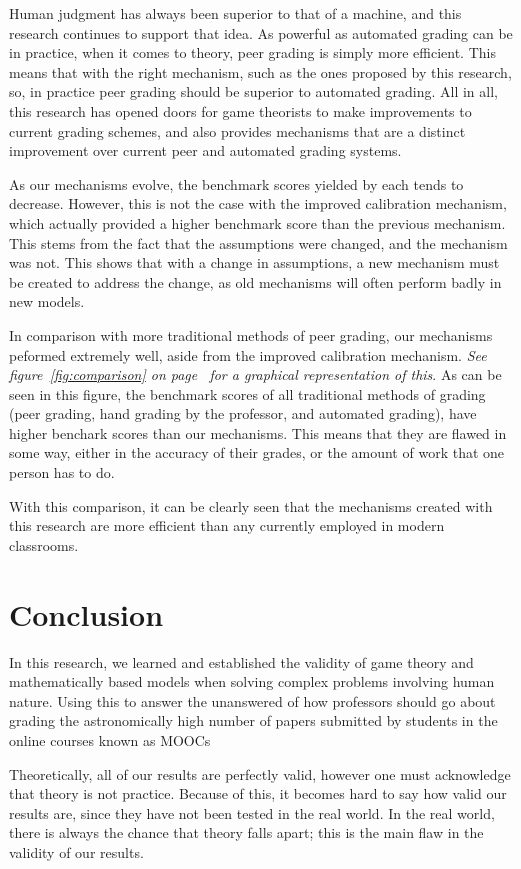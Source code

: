 \documentclass[12pt, Arial]{article}
\begin{document}
Human judgment has always been superior to that of a machine, and this research continues to support that idea. As powerful as automated grading can be in practice, when it comes to theory, peer grading is simply more efficient. This means that with the right mechanism, such as the ones proposed by this research, so, in practice peer grading should be superior to automated grading. All in all, this research has opened doors for game theorists to make improvements to current grading schemes, and also provides mechanisms that are a distinct improvement over current peer and automated grading systems.

As our mechanisms evolve, the benchmark scores yielded by each tends to decrease. However, this is not the case with the improved calibration mechanism, which actually provided a higher benchmark score than the previous mechanism. This stems from the fact that the assumptions were changed, and the mechanism was not. This shows that with a change in assumptions, a new mechanism must be created to address the change, as old mechanisms will often perform badly in new models.

In comparison with more traditional methods of peer grading, our mechanisms peformed extremely well, aside from the improved calibration mechanism. \emph{See figure~\ref{fig:comparison} on page~\pageref{fig:comparison} for a graphical representation of this}. As can be seen in this figure, the benchmark scores of all traditional methods of grading (peer grading, hand grading by the professor, and automated grading), have higher benchark scores than our mechanisms. This means that they are flawed in some way, either in the accuracy of their grades, or the amount of work that one person has to do.

With this comparison, it can be clearly seen that the mechanisms created with this research are more efficient than any currently employed in modern classrooms.

\section{Conclusion}
In this research, we learned and established the validity of game theory and mathematically based models when solving complex problems involving human nature. Using this to answer the unanswered of how professors should go about grading the astronomically high number of papers submitted by students in the online courses known as MOOCs

Theoretically, all of our results are perfectly valid, however one must acknowledge that theory is not practice. Because of this, it becomes hard to say how valid our results are, since they have not been tested in the real world. In the real world, there is always the chance that theory falls apart; this is the main flaw in the validity of our results.
\end{document}
